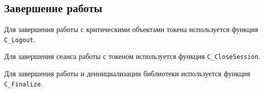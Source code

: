 \subsection{Завершение работы}

Для завершения работы с критическими объектами токена
используется функция \verb|C_Logout|.

Для завершения сеанса работы с токеном используется функция
\verb|C_CloseSession|.

Для завершения работы и деинициализации библиотеки
используется функция \verb|C_Finalize|.
\fi
